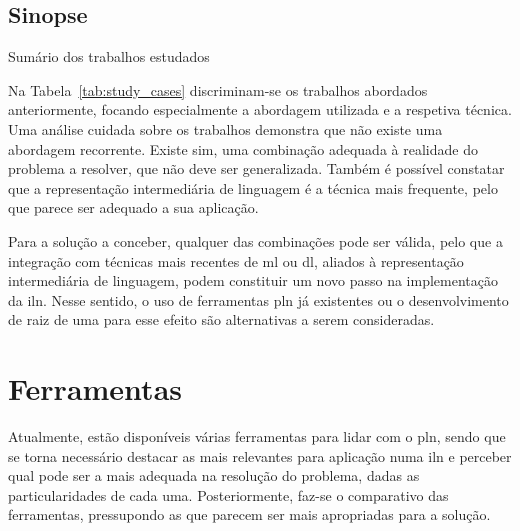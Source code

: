 \subsection{Sinopse}
%
\begin{table}
\caption{Sumário dos trabalhos estudados}
\label{tab:study_cases}
\centering
\resizebox{\textwidth}{!}{
\renewcommand{\arraystretch}{1.3}
\footnotesize
}
\end{table}
%
Na Tabela~\ref{tab:study_cases} discriminam-se os trabalhos abordados anteriormente, focando especialmente a abordagem utilizada e a respetiva técnica. Uma análise cuidada sobre os trabalhos demonstra que não existe uma abordagem recorrente. Existe sim, uma combinação adequada à realidade do problema a resolver, que não deve ser generalizada. Também é possível constatar que a representação intermediária de linguagem é a técnica mais frequente, pelo que parece ser adequado a sua aplicação.

Para a solução a conceber, qualquer das combinações pode ser válida, pelo que a integração com técnicas mais recentes de \gls{ml} ou \gls{dl}, aliados à representação intermediária de linguagem, podem constituir um novo passo na implementação da \gls{iln}. Nesse sentido, o uso de ferramentas \gls{pln} já existentes ou o desenvolvimento de raiz de uma para esse efeito são alternativas a serem consideradas.

\section{Ferramentas}
\label{sec:chap03_existingtools}
Atualmente, estão disponíveis várias ferramentas para lidar com o \gls{pln}, sendo que se torna necessário destacar as mais relevantes para aplicação numa \gls{iln} e perceber qual pode ser a mais adequada na resolução do problema, dadas as particularidades de cada uma. Posteriormente, faz-se o comparativo das ferramentas, pressupondo as que parecem ser mais apropriadas para a solução.

